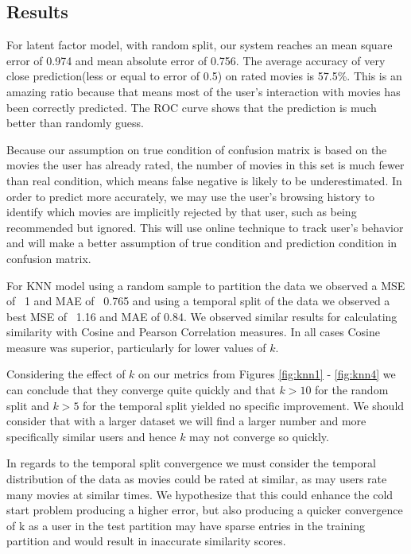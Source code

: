 \documentclass[10pt]{article}
\begin{document}
\subsection{Results}

For latent factor model, with random split, our system reaches an mean square error of 0.974 and mean absolute error of 0.756. The average accuracy of very close prediction(less or equal to error of 0.5) on rated movies is 57.5\%. This is an amazing ratio because that means most of the user's interaction with movies has been correctly predicted. The ROC curve shows that the prediction is much better than randomly guess.

Because our assumption on true condition of confusion matrix is based on the movies the user has already rated, the number of movies in this set is much fewer than real condition, which means false negative is likely to be underestimated. In order to predict more accurately, we may use the user's browsing history to identify which movies are implicitly rejected by that user, such as being recommended but ignored. This will use online technique to track user's behavior and will make a better assumption of true condition and prediction condition in confusion matrix.

For KNN model using a random sample to partition the data we observed a MSE of ~1 and MAE of ~0.765 and using a temporal split of the data we observed a best MSE of ~1.16 and MAE of 0.84. We observed similar results for calculating similarity with Cosine and Pearson Correlation measures. In all cases Cosine measure was superior, particularly for lower values of $k$.

Considering the effect of $k$ on our metrics from Figures \ref{fig:knn1} - \ref{fig:knn4} we can conclude that they converge quite quickly and that $k > 10$ for the random split and $k > 5$ for the temporal split yielded no specific improvement. We should consider that with a larger dataset we will find a larger number and more specifically similar users and hence $k$ may not converge so quickly. 

In regards to the temporal split convergence we must consider the temporal distribution of the data as movies could be rated at similar, as may users rate many movies at similar times. We hypothesize that this could enhance the cold start problem producing a higher error, but also producing a quicker convergence of k as a user in the test partition may have sparse entries in the training partition and would result in inaccurate similarity scores.    
\end{document}
